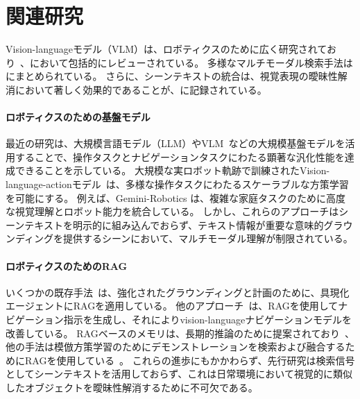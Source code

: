 \section{関連研究}
Vision-languageモデル（VLM）は、ロボティクスのために広く研究されており~\cite{brohan2023saycan, brohan2022rt}、\cite{XIAO2025129963, Ma2024ASO}において包括的にレビューされている。
多様なマルチモーダル検索手法は\cite{Cao+ijcal22, wang2024crossmodalretrievalsystematicreview}にまとめられている。
さらに、シーンテキストの統合は、視覚表現の曖昧性解消において著しく効果的であることが、\cite{Long2018SceneTD, Gupta2022}に記録されている。

\paragraph{ロボティクスのための基盤モデル}
最近の研究は、大規模言語モデル（LLM）やVLM~\cite{brohan2023saycan, Driess2023PaLMEAE, brohan2022rt}などの大規模基盤モデルを活用することで、操作タスクとナビゲーションタスクにわたる顕著な汎化性能を達成できることを示している。
大規模な実ロボット軌跡で訓練されたVision-language-actionモデル~\cite{brohan2022rt,Black2025pi05,wen2025dexvla,team2025gemini,li2025controlvla}は、多様な操作タスクにわたるスケーラブルな方策学習を可能にする。
例えば、Gemini-Robotics \cite{team2025gemini}は、複雑な家庭タスクのために高度な視覚理解とロボット能力を統合している。
しかし、これらのアプローチはシーンテキストを明示的に組み込んでおらず、テキスト情報が重要な意味的グラウンディングを提供するシーンにおいて、マルチモーダル理解が制限されている。

\paragraph{ロボティクスのためのRAG}
いくつかの既存手法~\cite{xie2025embodiedrag, zhu2024raea, xu2024prag, monaci2025rana, wang2025rag6dpose}は、強化されたグラウンディングと計画のために、具現化エージェントにRAGを適用している。
他のアプローチ~\cite{wang2025navrag, fan2024bevinstructor}は、RAGを使用してナビゲーション指示を生成し、それによりvision-languageナビゲーションモデルを改善している。
RAGベースのメモリは、長期的推論のために提案されており~\cite{anwar2025remembr}、他の手法は模倣方策学習のためにデモンストレーションを検索および融合するためにRAGを使用している~\cite{kumar2025collage}。
これらの進歩にもかかわらず、先行研究は検索信号としてシーンテキストを活用しておらず、これは日常環境において視覚的に類似したオブジェクトを曖昧性解消するために不可欠である。


